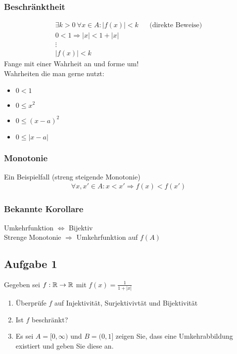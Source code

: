 \subsubsection{Beschränktheit}
\begin{align*}
    \exists k > 0 \: \forall x \in A: |f(x)| < k && \text{(direkte Beweise)}\\
    0 < 1 \Rightarrow |x| < 1 + |x|\\
    \vdots\\
    |f(x)| < k
\end{align*}
Fange mit einer Wahrheit an und forme um!\\
Wahrheiten die man gerne nutzt:
\begin{itemize}
    \item $0 < 1$
    \item $0 \leq x^2$
    \item $0 \leq (x - a)^2$
    \item $0 \leq |x - a|$
\end{itemize}

\subsubsection{Monotonie}
Ein Beispielfall (streng steigende Monotonie)
\begin{align*}
    \forall x, x' \in A: x < x' \Rightarrow f(x) < f(x')
\end{align*}

\subsubsection{Bekannte Korollare}
Umkehrfunktion $\Leftrightarrow$ Bijektiv\\
Strenge Monotonie $\Rightarrow$ Umkehrfunktion auf $f(A)$


\subsection{Aufgabe 1}
Gegeben sei $f: \mathbb R \rightarrow \mathbb R$ mit $f(x) = \frac{1}{1 + |x|}$
\begin{enumerate}[label=\alph*)]
    \item Überprüfe $f$ auf Injektivität, Surjektivivtät und Bijektivität
    \item Ist $f$ beschränkt?
    \item Es sei $A = [0, \infty)$ und $B = (0, 1]$ zeigen Sie, dass eine Umkehrabbildung existiert und geben Sie diese an.
\end{enumerate}




